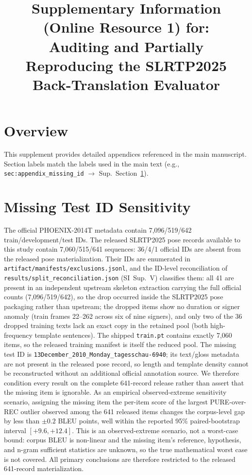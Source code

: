 \documentclass[pdflatex,sn-chicago]{sn-jnl}
\title[Supplementary Information (Online Resource 1)]{Supplementary Information (Online Resource 1) for:\\Auditing and Partially Reproducing the SLRTP2025 Back-Translation Evaluator}
\author*[1]{} %
\affil*[1]{}
\begin{document}
\maketitle

\renewcommand{\thefigure}{S\arabic{figure}}
\renewcommand{\thetable}{S\arabic{table}}

\section*{Overview}
This supplement provides detailed appendices referenced in the main manuscript. Section labels match the labels used in the main text (e.g., \texttt{sec:appendix\_missing\_id} $\to$ Sup.\ Section~\ref{sec:appendix_missing_id}).


\section{Missing Test ID Sensitivity}
\label{sec:appendix_missing_id}
The official PHOENIX-2014T metadata contain 7,096/519/642 train/development/test IDs. The released SLRTP2025 pose records available to this study contain 7,060/515/641 sequences: 36/4/1 official IDs are absent from the released pose materialization. Their IDs are enumerated in \texttt{artifact/manifests/exclusions.jsonl}, and the ID-level reconciliation of \texttt{results/split\_reconciliation.json} (SI~Sup.~V) classifies them: all 41 are present in an independent upstream skeleton extraction carrying the full official counts (7,096/519/642), so the drop occurred inside the SLRTP2025 pose packaging rather than upstream; the dropped items show no duration or signer anomaly (train frames 22--262 across six of nine signers), and only two of the 36 dropped training texts lack an exact copy in the retained pool (both high-frequency template sentences). The shipped \texttt{train.pt} contains exactly 7,060 items, so the released training manifest is itself the reduced pool. The missing test ID is \texttt{13December\_2010\_Monday\_tagesschau-6940}; its text/gloss metadata are not present in the released pose record, so length and template density cannot be reconstructed without an additional official annotation source. We therefore condition every result on the complete 641-record release rather than assert that the missing item is ignorable. As an empirical observed-extreme sensitivity scenario, assigning the missing item the per-item score of the largest PURE-over-REC outlier observed among the 641 released items changes the corpus-level gap by less than $\pm 0.2$ BLEU points, well within the reported 95\% paired-bootstrap interval $[+9.6,+12.4]$. This is an observed-extreme scenario, not a worst-case bound: corpus BLEU is non-linear and the missing item's reference, hypothesis, and n-gram sufficient statistics are unknown, so the true mathematical worst case is not covered. All primary conclusions are therefore restricted to the released 641-record materialization.
\end{document}
